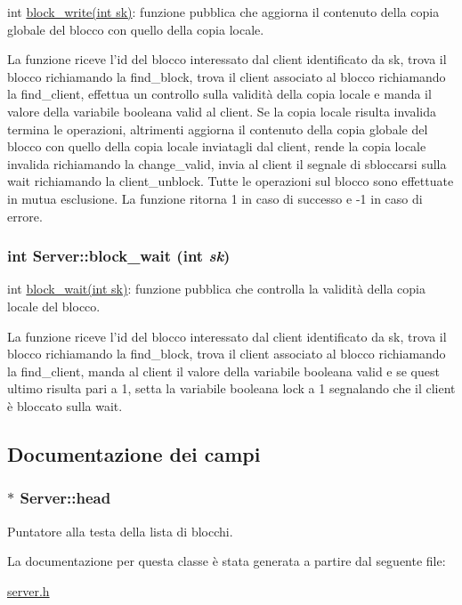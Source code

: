 int \hyperlink{classServer_40865edc01694851c5bf2318bd4e4d21_40865edc01694851c5bf2318bd4e4d21}{block\_\-write(int sk)}: funzione pubblica che aggiorna il contenuto della copia globale del blocco con quello della copia locale. 

La funzione riceve l'id del blocco interessato dal client identificato da sk, trova il blocco richiamando la find\_\-block, trova il client associato al blocco richiamando la find\_\-client, effettua un controllo sulla validità della copia locale e manda il valore della variabile booleana valid al client. Se la copia locale risulta invalida termina le operazioni, altrimenti aggiorna il contenuto della copia globale del blocco con quello della copia locale inviatagli dal client, rende la copia locale invalida richiamando la change\_\-valid, invia al client il segnale di sbloccarsi sulla wait richiamando la client\_\-unblock. Tutte le operazioni sul blocco sono effettuate in mutua esclusione. La funzione ritorna 1 in caso di successo e -1 in caso di errore. \hypertarget{classServer_bebb2e77eafaa102863516f4b357a2f0_bebb2e77eafaa102863516f4b357a2f0}{
\subsubsection[{block\_\-wait}]{\setlength{\rightskip}{0pt plus 5cm}int Server::block\_\-wait (int {\em sk})}}
\label{classServer_bebb2e77eafaa102863516f4b357a2f0_bebb2e77eafaa102863516f4b357a2f0}


int \hyperlink{classServer_bebb2e77eafaa102863516f4b357a2f0_bebb2e77eafaa102863516f4b357a2f0}{block\_\-wait(int sk)}: funzione pubblica che controlla la validità della copia locale del blocco. 

La funzione riceve l'id del blocco interessato dal client identificato da sk, trova il blocco richiamando la find\_\-block, trova il client associato al blocco richiamando la find\_\-client, manda al client il valore della variabile booleana valid e se quest ultimo risulta pari a 1, setta la variabile booleana lock a 1 segnalando che il client è bloccato sulla wait. 

\subsection{Documentazione dei campi}
\hypertarget{classServer_43ed3b1c5ed34934f250f28eb58cc85c_43ed3b1c5ed34934f250f28eb58cc85c}{
\subsubsection[{head}]{$\ast$ {\bf Server::head}}}
\label{classServer_43ed3b1c5ed34934f250f28eb58cc85c_43ed3b1c5ed34934f250f28eb58cc85c}


Puntatore alla testa della lista di blocchi. 



La documentazione per questa classe è stata generata a partire dal seguente file:\begin{CompactItemize}
\item 
\hyperlink{server_8h}{server.h}\end{CompactItemize}

